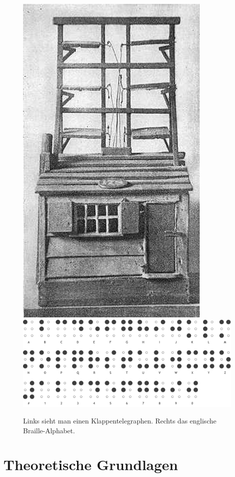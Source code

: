 \documentclass[a4paper,11pt]{scrartcl}%
\theoremstyle{change}
\theoremstyle{nonumberplain}
\theoremstyle{change}
\theoremstyle{nonumberplain}
\theoremstyle{change}
\theoremstyle{nonumberplain}
\begin{document}
	\begin{figure}[h]
	
		\includegraphics[scale=0.25]{./pics/shuttercabin}\cite{klappentelegraph}
		\hspace{25pt}
	 	\includegraphics[scale=0.17]{./pics/braille}\cite{braille}
	 	\caption{Links sieht man einen Klappentelegraphen. Rechts das englische Braille-Alphabet. }
	  	\label{fig:braille}
	\end{figure}
\newpage
\section{Theoretische Grundlagen}
\end{document}
